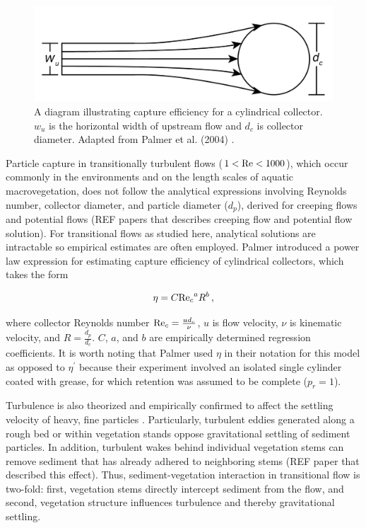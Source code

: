 \documentclass[geosciences,article,submit,moreauthors,pdftex]{Definitions/mdpi}
\begin{document}
\begin{figure}[H]
\includegraphics[width=5in]{../pics/collectorefficiency.png}
\centering
\caption{A diagram illustrating capture efficiency for a cylindrical collector. $w_u$ is the horizontal width of upstream flow and $d_c$ is collector diameter. Adapted from Palmer et al. (2004) \cite{Palmer_2004}.}
\label{fig:capeff}
\end{figure}

Particle capture in transitionally turbulent flows ($1<\mathrm{Re}<1000$), which occur commonly in the environments and on the length scales of aquatic macrovegetation, does not follow the analytical expressions involving Reynolds number, collector diameter, and particle diameter ($d_p$), derived for creeping flows and potential flows (REF papers that describes creeping flow and potential flow solution). For transitional flows as studied here, analytical solutions are intractable so empirical estimates are often employed. Palmer \cite{Palmer_2004} introduced a power law expression for estimating capture efficiency of cylindrical collectors, which takes the form 

\begin{equation}
    \eta=C{\mathrm{Re}_c}^{a}R^{b}\,,
    \label{eq:powerlaw}
\end{equation}

\noindent where collector Reynolds number $\mathrm{Re}_c=\frac{ud_c}{\nu}$, $u$ is flow velocity, $\nu$ is kinematic velocity, and $R=\frac{d_p}{d_c}$. $C$, $a$, and $b$ are empirically determined regression coefficients. It is worth noting that Palmer \cite{Palmer_2004} used $\eta$ in their notation for this model as opposed to $\eta^\prime$ because their experiment involved an isolated single cylinder coated with grease, for which retention was assumed to be complete ($p_r = 1$).

Turbulence is also theorized and empirically confirmed to affect the settling velocity of heavy, fine particles \citep{Nielsen_1993, Jacobs_2016, Wang_2018}. Particularly, turbulent eddies generated along a rough bed or within vegetation stands oppose gravitational settling of sediment particles. In addition, turbulent wakes behind individual vegetation stems can remove sediment that has already adhered to neighboring stems (REF paper that described this effect). Thus, sediment-vegetation interaction in transitional flow is two-fold: first, vegetation stems directly intercept sediment from the flow, and second, vegetation structure influences turbulence and thereby gravitational settling.
\end{document}

